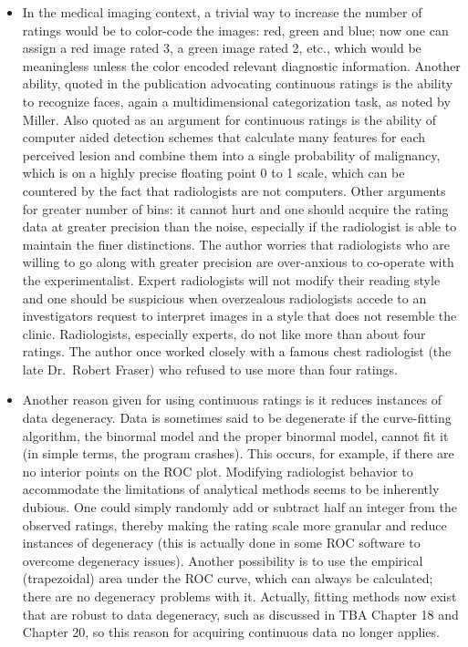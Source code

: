 \documentclass[
]{book}
\begin{document}
\begin{itemize}
\item
  In the medical imaging context, a trivial way to increase the number of ratings would be to color-code the images: red, green and blue; now one can assign a red image rated 3, a green image rated 2, etc., which would be meaningless unless the color encoded relevant diagnostic information. Another ability, quoted in the publication \citep{RN2179} advocating continuous ratings is the ability to recognize faces, again a multidimensional categorization task, as noted by Miller. Also quoted as an argument for continuous ratings is the ability of computer aided detection schemes that calculate many features for each perceived lesion and combine them into a single probability of malignancy, which is on a highly precise floating point 0 to 1 scale, which can be countered by the fact that radiologists are not computers. Other arguments for greater number of bins: it cannot hurt and one should acquire the rating data at greater precision than the noise, especially if the radiologist is able to maintain the finer distinctions. The author worries that radiologists who are willing to go along with greater precision are over-anxious to co-operate with the experimentalist. Expert radiologists will not modify their reading style and one should be suspicious when overzealous radiologists accede to an investigators request to interpret images in a style that does not resemble the clinic. Radiologists, especially experts, do not like more than about four ratings. The author once worked closely with a famous chest radiologist (the late Dr.~Robert Fraser) who refused to use more than four ratings.
\item
  Another reason given for using continuous ratings is it reduces instances of data degeneracy. Data is sometimes said to be degenerate if the curve-fitting algorithm, the binormal model and the proper binormal model, cannot fit it (in simple terms, the program crashes). This occurs, for example, if there are no interior points on the ROC plot. Modifying radiologist behavior to accommodate the limitations of analytical methods seems to be inherently dubious. One could simply randomly add or subtract half an integer from the observed ratings, thereby making the rating scale more granular and reduce instances of degeneracy (this is actually done in some ROC software to overcome degeneracy issues). Another possibility is to use the empirical (trapezoidal) area under the ROC curve, which can always be calculated; there are no degeneracy problems with it. Actually, fitting methods now exist that are robust to data degeneracy, such as discussed in TBA Chapter 18 and Chapter 20, so this reason for acquiring continuous data no longer applies.

\end{itemize}
\end{document}
